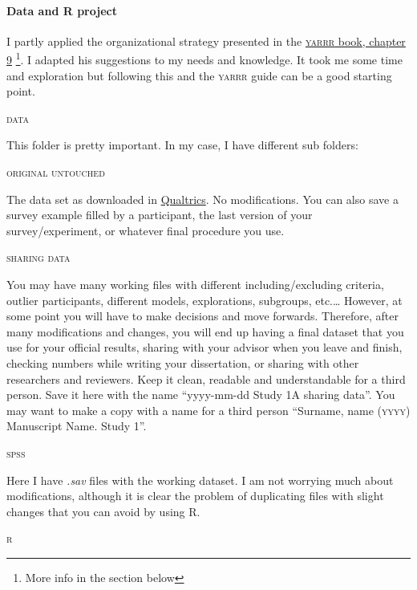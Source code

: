 \documentclass{article}
\begin{document}
\paragraph{Data and R project}
\label{parag: Data}
I partly applied the organizational strategy presented in the \href{https://bookdown.org/ndphillips/YaRrr/importingdata.html}{\textsc{yarrr} book, chapter 9} \footnote{More info in the  section below}. I adapted his suggestions to my needs and knowledge. It took me some time and exploration but following this and the \textsc{yarrr} guide can be a good starting point.
\begin{center}
    \textsc{data}
\end{center}
This folder is pretty important. In my case, I have different sub folders:
\begin{center}
    \textsc{original untouched}
\end{center}
The data set as downloaded in \href{https://www.qualtrics.com/uk/?rid=ip&prevsite=en&newsite=uk&geo=DE&geomatch=uk}{Qualtrics}. No modifications. You can also save a survey example filled by a participant, the last version of your survey/experiment, or whatever final procedure you use.
\begin{center}
    \textsc{sharing data}
\end{center}
You may have many working files with different including/excluding criteria, outlier participants, different models, explorations, subgroups, etc.… However, at some point you will have to make decisions and move forwards. Therefore, after many modifications and changes, you will end up having a final dataset that you use for your official results, sharing with your advisor when you leave and finish, checking numbers while writing your dissertation, or sharing with other researchers and reviewers. Keep it clean, readable and understandable for a third person. Save it here with the name “yyyy-mm-dd Study 1A sharing data”. You may want to make a copy with a name for a third person “Surname, name (\textsc{yyyy}) Manuscript Name. Study 1”. 
\begin{center}
    \textsc{spss}
\end{center}
Here I have \emph{.sav} files with the working dataset. I am not worrying much about modifications, although it is clear the problem of duplicating files with slight changes that you can avoid by using R.
\begin{center}
    \textsc{r}
\end{center}
\end{document}
